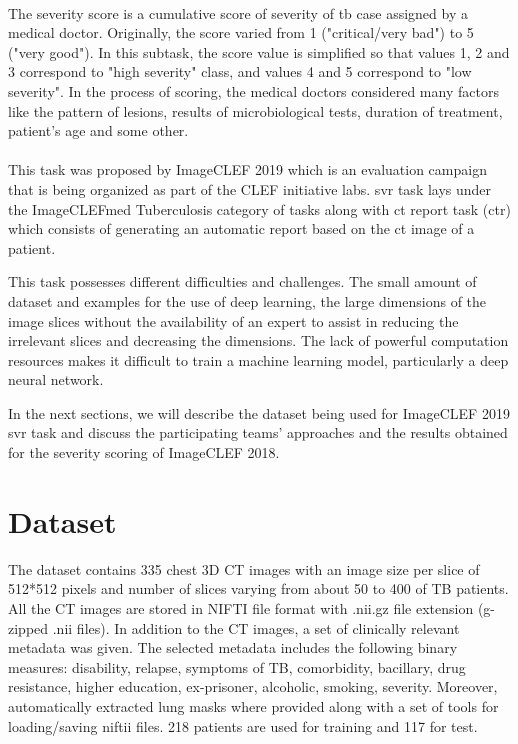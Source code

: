 \paragraph{}
The severity score is a cumulative score of severity of \acs{tb} case assigned by a medical doctor. Originally, the score varied from 1 ("critical/very bad") to 5 ("very good"). In this subtask, the score value is simplified so that values 1, 2 and 3 correspond to "high severity" class, and values 4 and 5 correspond to "low severity". In the process of scoring, the medical doctors considered many factors like the pattern of lesions, results of microbiological tests, duration of treatment, patient's age and some other.
\paragraph{}
This task was proposed by ImageCLEF 2019 which is an evaluation campaign that is being organized as part of the CLEF initiative labs. \acs{svr} task lays under the ImageCLEFmed Tuberculosis category of tasks along with \acs{ct} report task (\acs{ctr}) which consists of generating an automatic report based on the \acs{ct} image of a patient.

This task possesses different difficulties and challenges. The small amount of dataset and examples for the use of deep learning, the large dimensions of the image slices without the availability of an expert to assist in reducing the irrelevant slices and decreasing the dimensions. The lack of powerful computation resources makes it difficult to train a machine learning model, particularly a deep neural network.

In the next sections, we will describe the dataset being used for ImageCLEF 2019 \acs{svr} task and discuss the participating teams' approaches and the results obtained for the severity scoring of ImageCLEF 2018.

\section{Dataset}
The dataset contains 335 chest 3D CT images with an image size per slice of 512*512 pixels and number of slices varying from about 50 to 400 of TB patients. All the CT images are stored in NIFTI file format with .nii.gz file extension (g-zipped .nii files). In addition to the CT images, a set of clinically relevant metadata was given. The selected metadata includes the following binary measures: disability, relapse, symptoms of TB, comorbidity, bacillary, drug resistance, higher education, ex-prisoner, alcoholic, smoking, severity. Moreover, automatically extracted lung masks where provided along with a set of tools for loading/saving niftii files. 218 patients are used for training and 117 for test.
